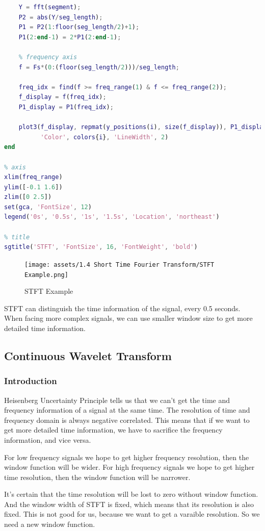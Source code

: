 \documentclass[12pt]{ctexart}
\begin{document}
\begin{lstlisting}[language=Matlab]
    % FFT
    Y = fft(segment);
    P2 = abs(Y/seg_length);
    P1 = P2(1:floor(seg_length/2)+1);
    P1(2:end-1) = 2*P1(2:end-1);

    % frequency axis
    f = Fs*(0:(floor(seg_length/2)))/seg_length;

    freq_idx = find(f >= freq_range(1) & f <= freq_range(2));
    f_display = f(freq_idx);
    P1_display = P1(freq_idx);

    plot3(f_display, repmat(y_positions(i), size(f_display)), P1_display, ...
          'Color', colors{i}, 'LineWidth', 2)
end

% axis
xlim(freq_range)
ylim([-0.1 1.6])
zlim([0 2.5])
set(gca, 'FontSize', 12)
legend('0s', '0.5s', '1s', '1.5s', 'Location', 'northeast')

% title
sgtitle('STFT', 'FontSize', 16, 'FontWeight', 'bold')
\end{lstlisting}

\begin{figure}[H]
  \centering
  \texttt{[image: assets/1.4 Short Time Fourier Transform/STFT
  Example.png]}
  \caption{STFT Example}
\end{figure}

STFT can distinguish the time information of the signal, every 0.5 seconds. When facing
more complex signals, we can use smaller window size to get more detailed time information.

\subsection{\textbf{Continuous Wavelet Transform}}

\subsubsection{\textbf{Introduction}}

Heisenberg Uncertainty Principle tells us that we can't get the time and frequency
information of a signal at the same time. The resolution of time and frequency domain
is always negative correlated. This means that if we want to get more detailed time
information, we have to sacrifice the frequency information, and vice versa.

For low frequency signals we hope to get higher frequency resolution, then the window
function will be wider. For high frequency signals we hope to get higher time
resolution, then the window function will be narrower.

It's certain that the time resolution will be lost to zero without window function. And
the window width of STFT is fixed, which means that its resolution is also fixed. This is
not good for us, because we want to get a varaible resolution. So we need a new window
function.
\end{document}
